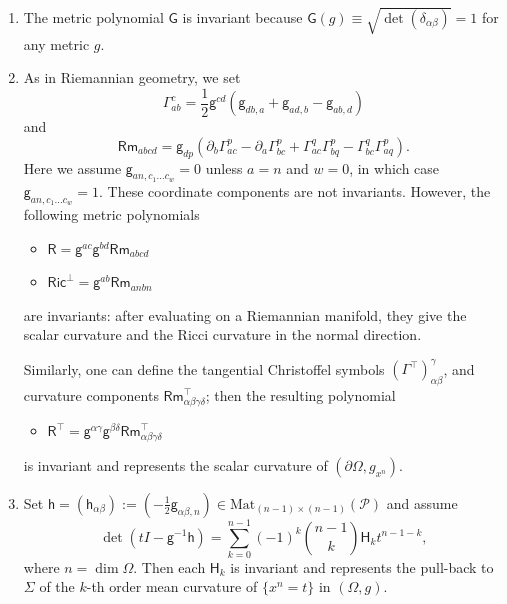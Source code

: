 \documentclass[11pt]{amsart}
\theoremstyle{definition}
\numberwithin{equation}{section}
\begin{document}
\begin{enumerate}
	\item  The metric polynomial $\mathsf G$ is invariant because $\mathsf G(g) \equiv \sqrt{\det(\delta_{\alpha\beta})} = 1$ for any metric $g$.
	\item As in Riemannian geometry, we set 
	\[\mathsf\Gamma_{ab}^c = \frac{1}{2}\mathsf g^{cd}(\mathsf g_{db,a} + \mathsf g_{ad,b} - \mathsf g_{ab,d})\]
	and 
	\[\mathsf{Rm}_{abcd} = \mathsf g_{dp}\left(\partial_b\mathsf\Gamma_{ac}^p-\partial_a\mathsf\Gamma_{bc}^p + \mathsf\Gamma_{ac}^q\mathsf\Gamma_{bq}^p - \mathsf\Gamma_{bc}^q\mathsf\Gamma_{aq}^p\right).\]
	Here we assume $\mathsf g_{an,c_1\dots c_w} = 0$ unless $a = n$ and $w=0$, in which case $\mathsf g_{an,c_1\dots c_w} = 1$. These coordinate components are not invariants.  However, the following   metric polynomials
	\begin{itemize}
		\item $\mathsf R = \mathsf g^{ac}\mathsf g^{bd}\mathsf{Rm}_{abcd}$
		\item $\mathsf {Ric}^\bot = \mathsf g^{ab}\mathsf{Rm}_{anbn}$
	\end{itemize} 
	are invariants: after evaluating on a Riemannian manifold, they  give the scalar curvature and the Ricci curvature in the normal direction.
	
	
	Similarly, one can define the tangential Christoffel symbols  $(\mathsf\Gamma^\top)_{\alpha\beta}^\gamma$, and curvature components $\mathsf{Rm}^\top_{\alpha\beta\gamma\delta}$; then the resulting polynomial 
	\begin{itemize}
		\item $\mathsf R^\top =  \mathsf g^{\alpha\gamma}\mathsf g^{\beta\delta}\mathsf{Rm}^\top_{\alpha\beta\gamma\delta}$
	\end{itemize}  
	is invariant and represents the scalar curvature of $(\partial\Omega,g_{x^n})$.
	\item Set $\mathsf h = (\mathsf h_{\alpha\beta}) := ( -\frac{1}{2}\mathsf g_{\alpha\beta,n})\in\mathrm{Mat}_{(n-1)\times(n-1)}(\mathcal P)$ and assume
	\[\det(tI-\mathsf g^{-1}\mathsf h) = \sum_{k=0}^{n-1}(-1)^k\binom{n-1}{k}\mathsf H_{k}t^{n-1-k},\]
	where $n=\dim \Omega$. 
	Then each $\mathsf H_k$ is invariant and represents the pull-back to $\Sigma$ of the $k$-th order mean curvature of $ \{x^n = t\}$ in $(\Omega, g)$.  
	

\end{enumerate}
\end{document}
